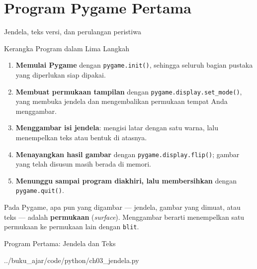 \documentclass[aspectratio=169,10pt]{beamer}
\begin{document}
\section{Program Pygame Pertama}
  {Jendela, teks versi, dan perulangan peristiwa}

\begin{frame}{Kerangka Program dalam Lima Langkah}
\begin{enumerate}
  \item \textbf{Memulai Pygame} dengan \texttt{pygame.init()}, sehingga seluruh
        bagian pustaka yang diperlukan siap dipakai.
  \item \textbf{Membuat permukaan tampilan} dengan
        \texttt{pygame.display.set\_mode()}, yang membuka jendela dan
        mengembalikan permukaan tempat Anda menggambar.
  \item \textbf{Menggambar isi jendela}: mengisi latar dengan satu warna, lalu
        menempelkan teks atau bentuk di atasnya.
  \item \textbf{Menayangkan hasil gambar} dengan \texttt{pygame.display.flip()};
        gambar yang telah disusun masih berada di memori.
  \item \textbf{Menunggu sampai program diakhiri, lalu membersihkan} dengan
        \texttt{pygame.quit()}.
\end{enumerate}
\vspace{0.15cm}
\begin{kotak}
Pada Pygame, apa pun yang digambar --- jendela, gambar yang dimuat, atau teks ---
adalah \textbf{permukaan} (\emph{surface}). Menggambar berarti menempelkan satu
permukaan ke permukaan lain dengan \texttt{blit}.
\end{kotak}
\end{frame}

\begin{frame}[fragile]{Program Pertama: Jendela dan Teks}

  {../buku_ajar/code/python/ch03_jendela.py}
\end{frame}
\end{document}
